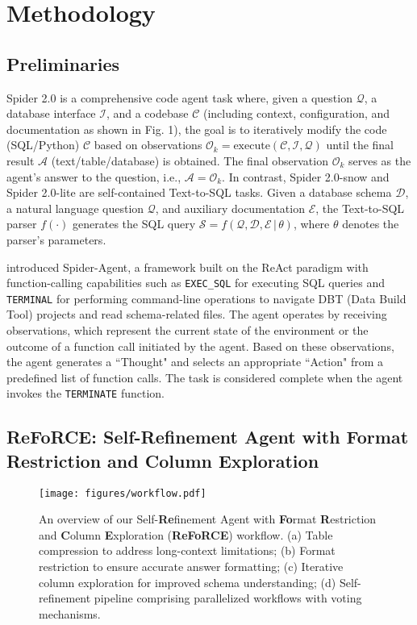 \section{Methodology}

\subsection{Preliminaries}
Spider 2.0 \citep{lei2024spider} is a comprehensive code agent task where, given a question $\mathcal{Q}$, a database interface $\mathcal{I}$, and a codebase $\mathcal{C}$ (including context, configuration, and documentation as shown in Fig. 1), the goal is to iteratively modify the code (SQL/Python) $\mathcal{C}$ based on observations $\mathcal{O}_k = \text{execute}(\mathcal{C}, \mathcal{I}, \mathcal{Q})$ until the final result $\mathcal{A}$ (text/table/database) is obtained. The final observation $\mathcal{O}_k$ serves as the agent’s answer to the question, i.e., $\mathcal{A} = \mathcal{O}_k$. In contrast, Spider 2.0-snow and Spider 2.0-lite are self-contained Text-to-SQL tasks. Given a database schema $\mathcal{D}$, a natural language question $\mathcal{Q}$, and auxiliary documentation $\mathcal{E}$, the Text-to-SQL parser $f(\cdot)$ generates the SQL query $\mathcal{S} = f(\mathcal{Q}, \mathcal{D}, \mathcal{E} \,|\, \theta)$, where $\theta$ denotes the parser’s parameters.

\cite{lei2024spider} introduced Spider-Agent, a framework built on the ReAct \cite{yao2023react} paradigm with function-calling capabilities such as \texttt{EXEC\_SQL} for executing SQL queries and \texttt{TERMINAL} for performing command-line operations to navigate DBT (Data Build Tool) projects and read schema-related files. The agent operates by receiving observations, which represent the current state of the environment or the outcome of a function call initiated by the agent. Based on these observations, the agent generates a ``Thought" and selects an appropriate ``Action" from a predefined list of function calls. The task is considered complete when the agent invokes the \texttt{TERMINATE} function.

\subsection{ReFoRCE: Self-Refinement Agent with Format Restriction and Column Exploration}

\begin{figure}[t]
    \centering
    \texttt{[image: figures/workflow.pdf]}
    \caption{An overview of our Self-\textbf{Re}finement Agent with \textbf{Fo}rmat \textbf{R}estriction and \textbf{C}olumn \textbf{E}xploration (\textbf{ReFoRCE}) workflow. (a) Table compression to address long-context limitations; (b) Format restriction to ensure accurate answer formatting; (c) Iterative column exploration for improved schema understanding; (d) Self-refinement pipeline comprising parallelized workflows with voting mechanisms.}
    \label{fig:prompting}
\end{figure}


